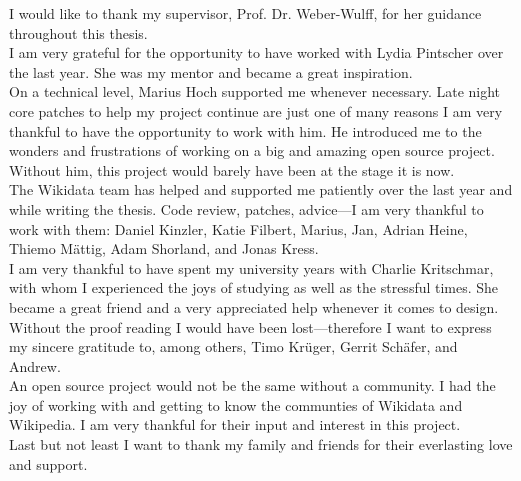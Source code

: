 I would like to thank my supervisor, Prof. Dr. Weber-Wulff, for her guidance throughout this thesis. \\

I am very grateful for the opportunity to have worked with Lydia Pintscher over the last year. She was my mentor and became a great inspiration. \\

On a technical level, Marius Hoch supported me whenever necessary. Late night core patches to help my project continue are just one of many reasons I am very thankful to have the opportunity to work with him. He introduced me to the wonders and frustrations of working on a big and amazing open source project. Without him, this project would barely have been at the stage it is now. \\

The Wikidata team has helped and supported me patiently over the last year and while writing the thesis. Code review, patches, advice---I am very thankful to work with them: Daniel Kinzler, Katie Filbert, Marius, Jan, Adrian Heine, Thiemo Mättig, Adam Shorland, and Jonas Kress.  \\

I am very thankful to have spent my university years with Charlie Kritschmar, with whom I experienced the joys of studying as well as the stressful times. She became a great friend and a very appreciated help whenever it comes to design. \\ 

Without the proof reading I would have been lost---therefore I want to express my sincere gratitude to, among others, Timo Krüger, Gerrit Schäfer, and Andrew. \\

An open source project would not be the same without a community. I had the joy of working with and getting to know the communties of Wikidata and Wikipedia. I am very thankful for their input and interest in this project. \\

Last but not least I want to thank my family and friends for their everlasting love and support.